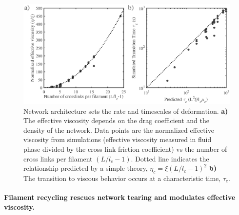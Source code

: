 \documentclass[10pt,letterpaper]{article}
\begin{document}
\begin{figure}[h!]
\centering
\includegraphics[width=\hsize]{figures/figure3b}
\caption{\label{fig:passive_form} Network architecture sets the rate and timescales of deformation. \textbf{a)} The effective viscosity depends on the drag coefficient and the density of the network. Data points are the normalized effective viscosity from simulations (effective viscosity measured in fluid phase divided by the cross link friction coefficient) vs the number of cross links per filament $(L/l_c - 1)$.  Dotted line indicates the relationship predicted by a simple theory, $\eta_c = \xi(L/l_c-1)^2$ \textbf{b)} The transition to viscous behavior occurs at a characteristic time, $\tau_c$.  }
\end{figure}


\paragraph{Filament recycling rescues network tearing and modulates effective viscosity.} 
 
\end{document}
